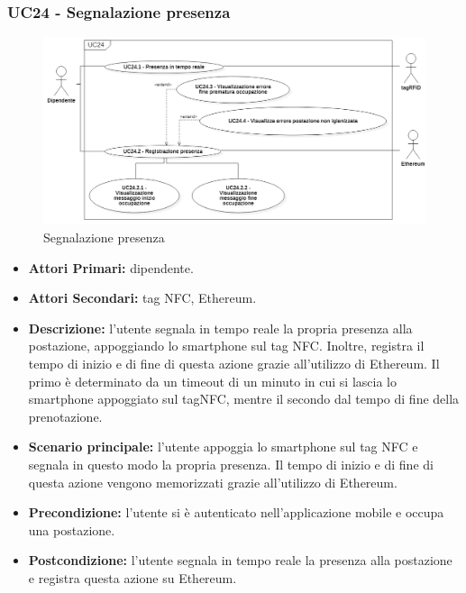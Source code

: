 \subsubsection{ UC24 - Segnalazione presenza}
\begin{figure}[H]
	\centering
	\includegraphics[width=15cm]{res/images/UC24.png}
	\caption{Segnalazione presenza}
	\label{fig:Segnalazione presenza}
\end{figure}
\begin{itemize}
	\item\textbf{Attori Primari:} dipendente.
	\item\textbf{Attori Secondari:} tag NFC, Ethereum.
	\item\textbf{Descrizione:} l’utente segnala in tempo reale la propria presenza alla postazione, appoggiando lo smartphone sul tag NFC. Inoltre, registra il tempo di inizio e di fine di questa azione grazie all'utilizzo di Ethereum. Il primo è determinato da un timeout di un minuto in cui si lascia lo smartphone appoggiato sul tagNFC, mentre il secondo dal tempo di fine della prenotazione.
	\item\textbf{Scenario principale:} l’utente appoggia lo smartphone sul tag NFC e segnala in questo modo la propria presenza.
	Il tempo di inizio e di fine di questa azione vengono memorizzati grazie all'utilizzo di Ethereum.
	\item\textbf{Precondizione:} l’utente si è autenticato nell'applicazione mobile e occupa una postazione.
	\item\textbf{Postcondizione:} l’utente segnala in tempo reale la presenza alla postazione e registra questa azione su Ethereum.
\end{itemize}



